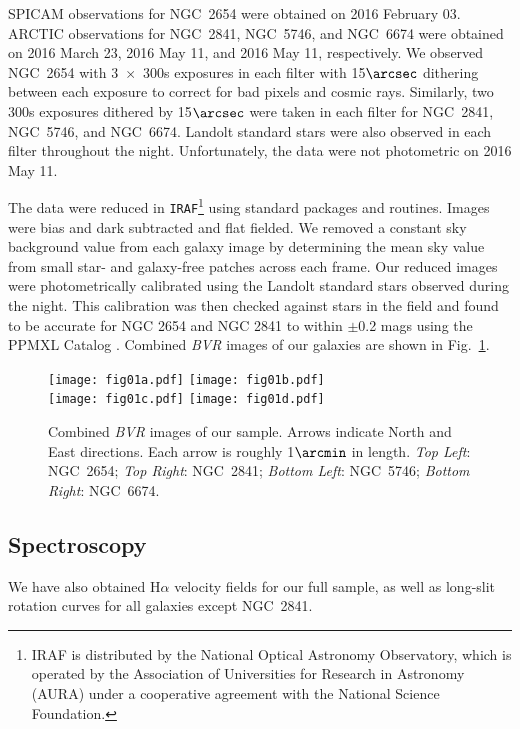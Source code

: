 \documentclass[a4paper,fleqn,usenatbib]{mnras}
\begin{document}
SPICAM observations for NGC~2654 were obtained on 2016 February 03. ARCTIC observations for NGC~2841, NGC~5746, and NGC~6674 were obtained on 2016 March 23, 2016 May 11, and 2016 May 11, respectively. We observed NGC~2654 with 3~$\times$~300s exposures in each filter with 15$\arcsec$ dithering between each exposure to correct for bad pixels and cosmic rays.  Similarly, two 300s exposures dithered by 15$\arcsec$ were taken in each filter for NGC~2841, NGC~5746, and NGC~6674.  Landolt standard stars \citep{landolt1992} were also observed in each filter throughout the night. Unfortunately, the data were not photometric on 2016 May 11.

The data were reduced in \texttt{IRAF}\footnote{IRAF is distributed by the National Optical Astronomy Observatory, which is operated by the Association of Universities for Research in Astronomy (AURA) under a cooperative agreement with the National Science Foundation.} using standard packages and routines. Images were bias and dark subtracted and flat fielded. We removed a constant sky background value from each galaxy image by determining the mean sky value from small star- and galaxy-free patches across each frame. Our reduced images were  photometrically calibrated using the Landolt standard stars observed during the night. This calibration was then checked against stars in the field and found to be accurate for NGC 2654 and NGC 2841 to within $\pm$0.2 mags using the PPMXL Catalog \citep{roeser2010}. Combined \textit{BVR} images of our galaxies are shown in Fig.~\ref{gal_pics}. 

\begin{figure*}
	\center
	\texttt{[image: fig01a.pdf]} \hskip 5mm \texttt{[image: fig01b.pdf]} \\
	\vskip 5mm
	\texttt{[image: fig01c.pdf]} \hskip 5mm \texttt{[image: fig01d.pdf]}
	\caption{Combined \textit{BVR} images of our sample. Arrows indicate North and East directions. Each arrow is roughly 1$\arcmin$ in length. \textit{Top Left}: NGC~2654; \textit{Top Right}: NGC~2841; \textit{Bottom Left}: NGC~5746; \textit{Bottom Right}: NGC~6674. }
	\label{gal_pics}
\end{figure*}

\subsection{Spectroscopy}
\label{sec:spectroscopy}

We have also obtained H$\alpha$ velocity fields for our full sample, as well as long-slit rotation curves for all galaxies except NGC~2841. 
\end{document}
